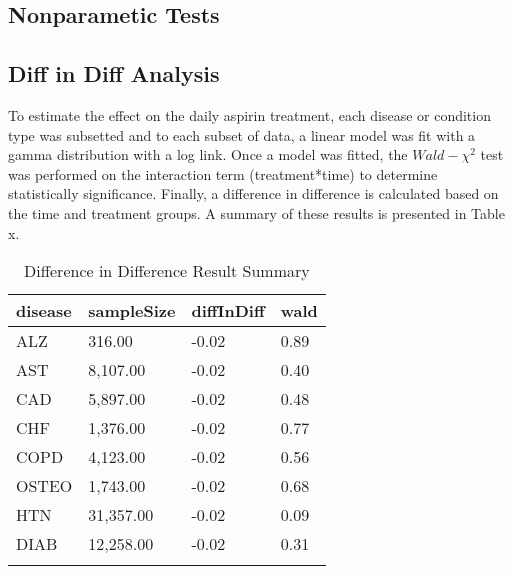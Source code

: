 \documentclass[
  english,
  man]{apa6}
\begin{document}
\hypertarget{nonparametic-tests}{%
\subsection{Nonparametic Tests}\label{nonparametic-tests}}

\hypertarget{diff-in-diff-analysis}{%
\subsection{Diff in Diff Analysis}\label{diff-in-diff-analysis}}

To estimate the effect on the daily aspirin treatment, each disease or condition type was subsetted and to each subset of data, a linear model was fit with a gamma distribution with a log link. Once a model was fitted, the \(Wald-\chi^2\) test was performed on the interaction term (treatment*time) to determine statistically significance. Finally, a difference in difference is calculated based on the time and treatment groups. A summary of these results is presented in Table x.

\begin{table}[tbp]

\begin{center}
\begin{threeparttable}

\caption{\label{tab:diffTable}Difference in Difference Result Summary}

\begin{tabular}{llll}
\toprule{}
disease & \multicolumn{1}{c}{sampleSize} & \multicolumn{1}{c}{diffInDiff} & \multicolumn{1}{c}{wald}\\
\midrule{}
ALZ & 316.00 & -0.02 & 0.89\\
AST & 8,107.00 & -0.02 & 0.40\\
CAD & 5,897.00 & -0.02 & 0.48\\
CHF & 1,376.00 & -0.02 & 0.77\\
COPD & 4,123.00 & -0.02 & 0.56\\
OSTEO & 1,743.00 & -0.02 & 0.68\\
HTN & 31,357.00 & -0.02 & 0.09\\
DIAB & 12,258.00 & -0.02 & 0.31\\
\bottomrule{}
\end{tabular}

\end{threeparttable}
\end{center}

\end{table}
\end{document}
